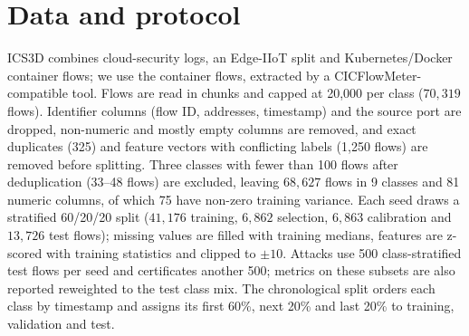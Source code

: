 \documentclass{article}
\theoremstyle{definition}
\begin{document}
\section{Data and protocol}\label{app:data}
ICS3D \citep{anon_ics3d} combines cloud-security logs, an Edge-IIoT split and
Kubernetes/Docker container flows; we use the container flows, extracted by a
CICFlowMeter-compatible tool. Flows are read in chunks and capped at 20{,}000 per
class ($70{,}319$ flows). Identifier columns (flow ID, addresses, timestamp) and the
source port are dropped, non-numeric and mostly empty columns are removed, and
exact duplicates (325) and feature vectors with conflicting labels (1{,}250
flows) are removed before splitting. Three classes with fewer than 100 flows
after deduplication (33--48 flows) are excluded, leaving $68{,}627$ flows in 9
classes and 81 numeric columns, of which 75 have non-zero training variance.
Each seed draws a stratified 60/20/20 split ($41{,}176$ training,
$6{,}862$ selection, $6{,}863$ calibration and $13{,}726$ test flows); missing
values are filled with training medians, features are z-scored with training
statistics and clipped to $\pm10$. Attacks use 500 class-stratified test flows per
seed and certificates another 500; metrics on these subsets are also reported
reweighted to the test class mix. The chronological split orders each class by
timestamp and assigns its first 60\%, next 20\% and last 20\% to training,
validation and test.

\end{document}
